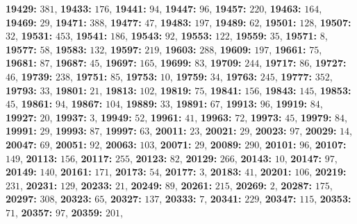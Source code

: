\textsf{\bfseries 19429:} $381$, \textsf{\bfseries 19433:} $176$, \textsf{\bfseries 19441:} $94$, \textsf{\bfseries 19447:} $96$, \textsf{\bfseries 19457:} $220$, \textsf{\bfseries 19463:} $164$, \textsf{\bfseries 19469:} $29$, \textsf{\bfseries 19471:} $388$, \textsf{\bfseries 19477:} $47$, \textsf{\bfseries 19483:} $197$, \textsf{\bfseries 19489:} $62$, \textsf{\bfseries 19501:} $128$, \textsf{\bfseries 19507:} $32$, \textsf{\bfseries 19531:} $453$, \textsf{\bfseries 19541:} $186$, \textsf{\bfseries 19543:} $92$, \textsf{\bfseries 19553:} $122$, \textsf{\bfseries 19559:} $35$, \textsf{\bfseries 19571:} $8$, \textsf{\bfseries 19577:} $58$, \textsf{\bfseries 19583:} $132$, \textsf{\bfseries 19597:} $219$, \textsf{\bfseries 19603:} $288$, \textsf{\bfseries 19609:} $197$, \textsf{\bfseries 19661:} $75$, \textsf{\bfseries 19681:} $87$, \textsf{\bfseries 19687:} $45$, \textsf{\bfseries 19697:} $165$, \textsf{\bfseries 19699:} $83$, \textsf{\bfseries 19709:} $244$, \textsf{\bfseries 19717:} $86$, \textsf{\bfseries 19727:} $46$, \textsf{\bfseries 19739:} $238$, \textsf{\bfseries 19751:} $85$, \textsf{\bfseries 19753:} $10$, \textsf{\bfseries 19759:} $34$, \textsf{\bfseries 19763:} $245$, \textsf{\bfseries 19777:} $352$, \textsf{\bfseries 19793:} $33$, \textsf{\bfseries 19801:} $21$, \textsf{\bfseries 19813:} $102$, \textsf{\bfseries 19819:} $75$, \textsf{\bfseries 19841:} $156$, \textsf{\bfseries 19843:} $145$, \textsf{\bfseries 19853:} $45$, \textsf{\bfseries 19861:} $94$, \textsf{\bfseries 19867:} $104$, \textsf{\bfseries 19889:} $33$, \textsf{\bfseries 19891:} $67$, \textsf{\bfseries 19913:} $96$, \textsf{\bfseries 19919:} $84$, \textsf{\bfseries 19927:} $20$, \textsf{\bfseries 19937:} $3$, \textsf{\bfseries 19949:} $52$, \textsf{\bfseries 19961:} $41$, \textsf{\bfseries 19963:} $72$, \textsf{\bfseries 19973:} $45$, \textsf{\bfseries 19979:} $84$, \textsf{\bfseries 19991:} $29$, \textsf{\bfseries 19993:} $87$, \textsf{\bfseries 19997:} $63$, \textsf{\bfseries 20011:} $23$, \textsf{\bfseries 20021:} $29$, \textsf{\bfseries 20023:} $97$, \textsf{\bfseries 20029:} $14$, \textsf{\bfseries 20047:} $69$, \textsf{\bfseries 20051:} $92$, \textsf{\bfseries 20063:} $103$, \textsf{\bfseries 20071:} $29$, \textsf{\bfseries 20089:} $290$, \textsf{\bfseries 20101:} $96$, \textsf{\bfseries 20107:} $149$, \textsf{\bfseries 20113:} $156$, \textsf{\bfseries 20117:} $255$, \textsf{\bfseries 20123:} $82$, \textsf{\bfseries 20129:} $266$, \textsf{\bfseries 20143:} $10$, \textsf{\bfseries 20147:} $97$, \textsf{\bfseries 20149:} $140$, \textsf{\bfseries 20161:} $171$, \textsf{\bfseries 20173:} $54$, \textsf{\bfseries 20177:} $3$, \textsf{\bfseries 20183:} $41$, \textsf{\bfseries 20201:} $106$, \textsf{\bfseries 20219:} $231$, \textsf{\bfseries 20231:} $129$, \textsf{\bfseries 20233:} $21$, \textsf{\bfseries 20249:} $89$, \textsf{\bfseries 20261:} $215$, \textsf{\bfseries 20269:} $2$, \textsf{\bfseries 20287:} $175$, \textsf{\bfseries 20297:} $308$, \textsf{\bfseries 20323:} $65$, \textsf{\bfseries 20327:} $137$, \textsf{\bfseries 20333:} $7$, \textsf{\bfseries 20341:} $229$, \textsf{\bfseries 20347:} $115$, \textsf{\bfseries 20353:} $71$, \textsf{\bfseries 20357:} $97$, \textsf{\bfseries 20359:} $201$, 
